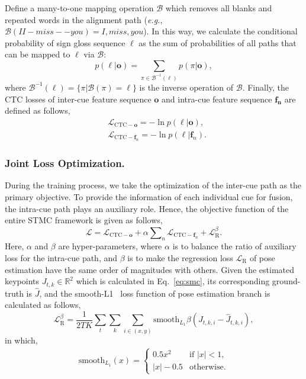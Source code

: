 \documentclass[letterpaper]{article} %
\def\lbf{{\boldsymbol\ell}}
\begin{document}
Define a many-to-one mapping operation $\mathcal{B}$ which removes all blanks and repeated words in the alignment path (\emph{e.g.}, $\mathcal{B}(II-miss--you)=I,miss,you$). In this way, we calculate the conditional probability of sign gloss sequence $\lbf$ as the sum of probabilities of all paths that can be mapped to $\lbf$ via $\mathcal{B}$:
\begin{equation}
    p(\lbf | \mathbf{o}) = \sum_{\pi \in \mathcal{B}^{-1}(\lbf)}  p(\pi | \mathbf{o}),
\end{equation}
where \(\mathcal{B}^{-1}(\lbf)\!=\!\{\pi | \mathcal{B}(\pi)\!=\!\lbf\}\) is the inverse operation of \(\mathcal{B}\). Finally, the CTC losses of inter-cue feature sequence $\mathbf{o}$ and intra-cue feature sequence $\mathbf{f_n}$ are defined as follows,
\begin{align}
    &\mathcal{L}_{\text{CTC}-\mathbf{o}} = -\ln{p(\lbf | \mathbf{o})}, \\
    &\mathcal{L}_{\text{CTC}-\mathbf{f}_n} = -\ln{p(\lbf | \mathbf{f}_n)}.
\end{align}


\subsubsection{Joint Loss Optimization.}
During the training process, we take the optimization of the inter-cue path as the primary objective. To provide the information of each individual cue for fusion, the intra-cue path plays an auxiliary role. Hence, the objective function of the entire STMC framework is given as follows,
\begin{equation} \label{eq:joint_loss}
    \mathcal{L} = \mathcal{L}_{\text{CTC}-\mathbf{o}}+\alpha \sum\nolimits_{n}{\mathcal{L}_{\text{CTC}-\mathbf{f}_n}} + \mathcal{L}_{\text{R}}^{\beta}.
\end{equation} 
Here, $\alpha$ and $\beta$ are hyper-parameters, where $\alpha$ is to balance the ratio of auxiliary loss for the intra-cue path, and $\beta$ is to make the regression loss $\mathcal{L}_{\text{R}}$ of pose estimation have the same order of magnitudes with others. 
Given the estimated keypoints $J_{t,k}\in\mathbb{R}^2$ which is calculated in Eq.~\ref{eq:smc}, its corresponding ground-truth is $\hat{J}$, and the smooth-L1~\cite{girshick2015fast} loss function of pose estimation branch is calculated as follows,
\begin{equation}
    \mathcal{L}_{\text{R}}^{\beta} = \frac{1}{2T\!K} \sum_t \sum_k \sum_{i\in(x,y)}  \text{smooth}_{L_1}\beta( J_{t,k,i}- \hat{J}_{t,k,i}),
\end{equation}
in which,
\begin{align}
    \text{smooth}_{L_1}(x) = \begin{cases}
          0.5 x^2  &\text{if $|x|<1$,} \\
          |x|-0.5  &\text{otherwise.}      
        \end{cases} 
\end{align}
\end{document}
